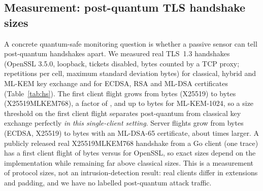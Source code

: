 \IfFileExists{IEEEtran.cls}{\documentclass[conference]{IEEEtran}}{\documentclass[10pt,twocolumn]{article}\usepackage[margin=0.8in]{geometry}}
\newcommand{\fit}[1]{\resizebox{\ifdim\width>\columnwidth\columnwidth\else\width\fi}{!}{#1}}
\begin{document}
\subsection{Measurement: post-quantum TLS handshake sizes}
A concrete quantum-safe monitoring question is whether a passive sensor can tell post-quantum handshakes apart. We measured real TLS~1.3 handshakes (OpenSSL 3.5.0, loopback, tickets disabled, bytes counted by a TCP proxy; \hsReps{} repetitions per cell, maximum standard deviation \hsStdMax{} bytes) for classical, hybrid and ML-KEM key exchange and for ECDSA, RSA and ML-DSA certificates (Table~\ref{tab:hs}). The first client flight grows from \hsChClassical{} bytes (X25519) to \hsChHybrid{} bytes (X25519MLKEM768), a factor of \hsChRatio{}, and up to \hsChMax{} bytes for ML-KEM-1024, so a size threshold on the first client flight separates post-quantum from classical key exchange perfectly \emph{in this single-client setting}. Server flights grow from \hsSrvClassical{} bytes (ECDSA, X25519) to \hsSrvHybridMldsa{} bytes with an ML-DSA-65 certificate, about \hsSrvRatio{} times larger. A publicly released real X25519MLKEM768 handshake from a Go client (one trace) has a first client flight of \hsGoCh{} bytes versus \hsChHybrid{} for OpenSSL, so exact sizes depend on the implementation while remaining far above classical sizes. This is a measurement of protocol sizes, not an intrusion-detection result: real clients differ in extensions and padding, and we have no labelled post-quantum attack traffic.

\begin{table}[t]\centering\caption{Measured TLS~1.3 handshake bytes. Server$\to$client bytes by certificate type.}\label{tab:hs}\small\fit{}\end{table}
\end{document}
